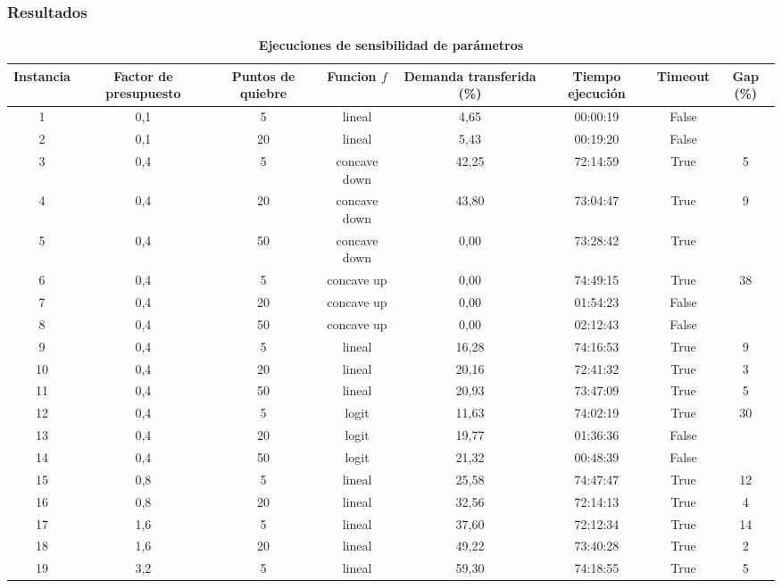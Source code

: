 \documentclass{article}
\begin{document}
  \subsubsection*{Resultados}

  \begin{table}
    \centering
    \caption*{{\bf Ejecuciones de sensibilidad de parámetros}}
    \begin{tabular}{cccccccc}
        \toprule
        Instancia & Factor de presupuesto & Puntos de quiebre & Funcion $f$ & Demanda transferida (\%) & Tiempo ejecución & Timeout & Gap (\%) \\
        \midrule
        1 & 0,1 & 5 & lineal & 4,65 & 00:00:19 & False &  \\
        2 & 0,1 & 20 & lineal & 5,43 & 00:19:20 & False &  \\
        3 & 0,4 & 5 & concave down & 42,25 & 72:14:59 & True & 5 \\
        4 & 0,4 & 20 & concave down & 43,80 & 73:04:47 & True & 9 \\
        5 & 0,4 & 50 & concave down & 0,00 & 73:28:42 & True &  \\
        6 & 0,4 & 5 & concave up & 0,00 & 74:49:15 & True & 38 \\
        7 & 0,4 & 20 & concave up & 0,00 & 01:54:23 & False &  \\
        8 & 0,4 & 50 & concave up & 0,00 & 02:12:43 & False &  \\
        9 & 0,4 & 5 & lineal & 16,28 & 74:16:53 & True & 9 \\
        10 & 0,4 & 20 & lineal & 20,16 & 72:41:32 & True & 3 \\
        11 & 0,4 & 50 & lineal & 20,93 & 73:47:09 & True & 5 \\
        12 & 0,4 & 5 & logit & 11,63 & 74:02:19 & True & 30 \\
        13 & 0,4 & 20 & logit & 19,77 & 01:36:36 & False &  \\
        14 & 0,4 & 50 & logit & 21,32 & 00:48:39 & False &  \\
        15 & 0,8 & 5 & lineal & 25,58 & 74:47:47 & True & 12 \\
        16 & 0,8 & 20 & lineal & 32,56 & 72:14:13 & True & 4 \\
        17 & 1,6 & 5 & lineal & 37,60 & 72:12:34 & True & 14 \\
        18 & 1,6 & 20 & lineal & 49,22 & 73:40:28 & True & 2 \\
        19 & 3,2 & 5 & lineal & 59,30 & 74:18:55 & True & 5 \\

\end{tabular}
\end{table}
\end{document}
